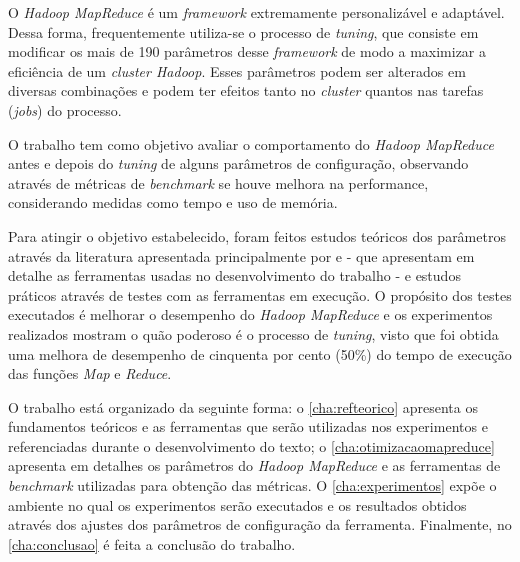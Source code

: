 O \textit{Hadoop MapReduce} é um \textit{\gls{framework}} extremamente personalizável e adaptável. Dessa forma, frequentemente utiliza-se o processo de \textit{\gls{tuning}}, que consiste em modificar os mais de 190 parâmetros desse \textit{\gls{framework}} de modo a maximizar a eficiência de um \textit{cluster Hadoop}. Esses parâmetros podem ser alterados em diversas combinações e podem ter efeitos tanto no \textit{cluster} quantos nas tarefas (\textit{jobs}) do processo.

O trabalho tem como objetivo avaliar o comportamento do \textit{Hadoop MapReduce} antes e depois do \textit{\gls{tuning}} de alguns parâmetros de configuração, observando através de métricas de \textit{\gls{benchmark}} se houve melhora na performance, considerando medidas como tempo e uso de memória.

Para atingir o objetivo estabelecido, foram feitos estudos teóricos dos parâmetros através da literatura apresentada principalmente por \textcite{HadoopBook15} e \textcite{ProHadoop09} - que apresentam em detalhe as ferramentas usadas no desenvolvimento do trabalho - e estudos práticos através de testes com as ferramentas em execução. O propósito dos testes executados é melhorar o desempenho do \textit{Hadoop MapReduce} e os experimentos realizados mostram o quão poderoso é o processo de \textit{\gls{tuning}}, visto que foi obtida uma melhora de desempenho de cinquenta por cento (50\%) do tempo de execução das funções \textit{Map} e \textit{Reduce}.

O trabalho está organizado da seguinte forma: o \autoref{cha:refteorico} apresenta os fundamentos teóricos e as ferramentas que serão utilizadas nos experimentos e referenciadas durante o desenvolvimento do texto; o \autoref{cha:otimizacaomapreduce} apresenta em detalhes os parâmetros do \textit{Hadoop MapReduce} e as ferramentas de \textit{\gls{benchmark}} utilizadas para obtenção das métricas. O \autoref{cha:experimentos} expõe o ambiente no qual os experimentos serão executados e os resultados obtidos através dos ajustes dos parâmetros de configuração da ferramenta. Finalmente, no \autoref{cha:conclusao} é feita a conclusão do trabalho.